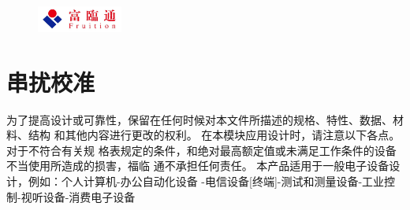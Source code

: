 \documentclass{scrreprt}
\newcommand{\pchapter}[1]{
	\begingroup\let\clearpage\relax
	\newpage
	\begin{figure}[H]
		\includegraphics[width=0.25\textwidth]{logo.jpeg}
	\end{figure}
	\chapter{#1}
	\endgroup
}
\begin{document}
\begin{CJK*}{UTF8}{gbsn}
\pchapter{串扰校准}
为了提高设计或可靠性，保留在任何时候对本文件所描述的规格、特性、数据、材料、结构
和其他内容进行更改的权利。 在本模块应用设计时，请注意以下各点。 对于不符合有关规
格表规定的条件，和绝对最高额定值或未满足工作条件的设备不当使用所造成的损害，福临
通不承担任何责任。 本产品适用于一般电子设备设计，例如：个人计算机-办公自动化设备
-电信设备[终端]-测试和测量设备-工业控制-视听设备-消费电子设备

\end{CJK*}
\end{document}
